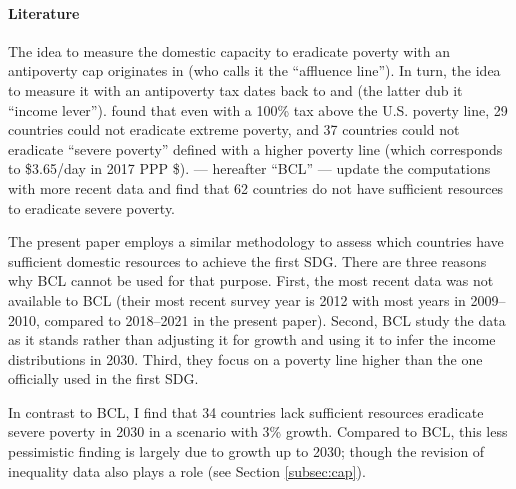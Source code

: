 \paragraph{Literature} 

The idea to measure the domestic capacity to eradicate poverty with an antipoverty cap originates in \cite{medeiros_rich_2006} (who calls it the ``affluence line''). In turn, the idea to measure it with an antipoverty tax dates back to \cite{ravallion_poorer_2010} and \cite{ceriani_income_2014} (the latter dub it ``income lever''). \cite{ravallion_poorer_2010} found that even with a 100\% tax above the U.S. poverty line, 29 countries could not eradicate extreme poverty, and 37 countries could not eradicate ``severe poverty'' defined with a higher poverty line (which corresponds to \$3.65/day in 2017 PPP \$). %
\cite{bolch_arithmetics_2022} --- hereafter ``BCL'' --- update the computations with more recent data and find that 62 countries do not have sufficient resources to eradicate severe poverty. %

The present paper employs a similar methodology to assess which countries have sufficient domestic resources to achieve the first SDG. There are three reasons why BCL cannot be used %
for that purpose. 
First, the most recent data was not available to BCL (their most recent survey year is 2012 with most years in 2009--2010, compared to 2018--2021 in the present paper). %
Second, BCL study the data as it stands rather than adjusting it for growth and using it to infer the income distributions in 2030. Third, they focus on a poverty line higher than the one officially used in the first SDG.

In contrast to BCL, I find that 34 countries lack sufficient resources eradicate severe poverty in 2030 in a scenario with 3\% growth. Compared to BCL, this less pessimistic finding is largely due to growth up to 2030; though the revision of inequality data also plays a role (see Section \ref{subsec:cap}). 

